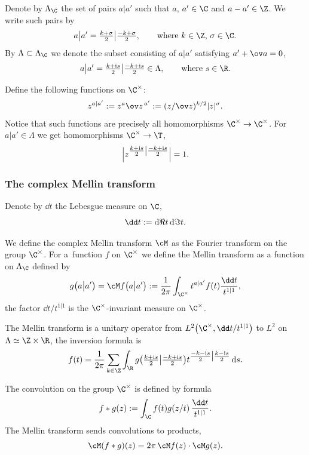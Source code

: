 Denote by $\Lambda_\C$ the set of pairs
$a\big| a'$ such that $a$, $a'\in\C$ and $a-a'\in\Z$.
We write such pairs by
\[
a\big|a'=\tfrac{k+\sigma}2\big|\tfrac{-k+\sigma}2,
\qquad\text{where $k\in\Z$, $\sigma\in\C$}.
\]
By $\Lambda\subset \Lambda_\C$ we denote the subset
consisting of $a|a'$ satisfying $a'+\ov a=0$,
\[
a\big|a'=
\tfrac{k+{\rm i}s}2\big|\tfrac{-k+{\rm i}s}2\in \Lambda,\qquad\text{where $s\in \R$}.
\]

Define the following functions on $\C^\times$:
\[
z^{a|a'}:= z^a \ov z^{\,a'}:= (z/\ov z)^{k/2} |z|^{\sigma}.
\]
Notice that such functions are precisely all homomorphisms
$\C^\times\to \C^\times$.
For $a|a'\in \Lambda$ we get homomorphisms $\C^\times\to \T$,
\[
\Big|z^{\tfrac{k+{\rm i}s}2\big|\tfrac{-k+{\rm i}s}2} \Big|=1.
\]

\subsubsection{The complex Mellin transform}
Denote by $\dd t$ the Lebesgue measure on $\C$,
\[
\dd t:= {\rm d}\Re t\, {\rm d}\Im t.
\]

We define the complex Mellin transform $\cM$ as the Fourier transform on the group $\C^\times$.
For a~function $f$ on $\C^\times$ we define the Mellin transform as a function
on $\Lambda_\C$ defined by
\[
g\big(a\big|a'\big)=
\cM f\big(a\big|a'\big):=\frac 1{2\pi}
\int_{\C^\times} t^{a|a'} f(t)\frac {\dd t}{t^{1|1}},
\]
the factor ${\dd t}/{t^{1|1}}$ is the $\C^\times$-invariant measure on $\C^\times$.

The Mellin transform is a unitary operator from
$L^2\big(\C^\times,{\dd t}/{t^{1|1}} \big)$
to $L^2$ on $\Lambda\simeq \Z\times\R$, the inversion formula is
\begin{equation*}
f(t)=\frac 1{2\pi}\sum_{k\in\Z} \int_\R g\big(\tfrac{k+{\rm i}s}2\big|\tfrac{-k+{\rm i}s}2\big) t^{{\tfrac{-k-{\rm i}s}2\big|\tfrac{k-{\rm i}s}2} }\,{\rm d}s.
\end{equation*}

The convolution on the group
$\C^\times$ is defined by formula
\[ f*g(z):=\int_\C f(t)g(z/t)\,\frac{\dd t}{t^{1|1}}.
\]
The Mellin transform sends convolutions to products,
\[
\cM (f*g)(z)=2\pi\, \cM f(z)\cdot \cM g(z).
\]

